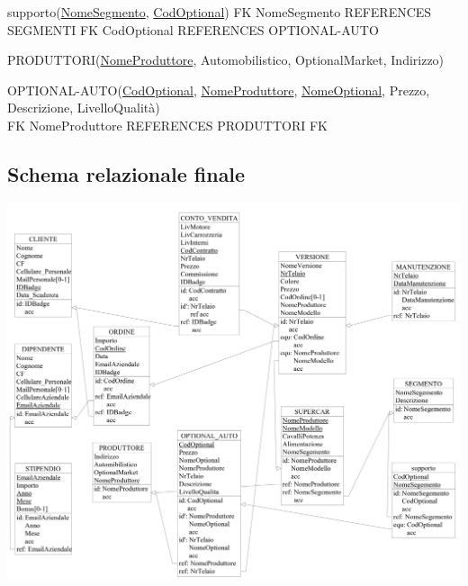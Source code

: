\documentclass[11pt]{article}
\begin{document}
\begin{flushleft}
supporto(\underline{NomeSegmento}, \underline{CodOptional})
FK NomeSegmento REFERENCES SEGMENTI
FK CodOptional REFERENCES OPTIONAL-AUTO
\end{flushleft}

\begin{flushleft}
PRODUTTORI(\underline{NomeProduttore}, Automobilistico, OptionalMarket, Indirizzo)
\end{flushleft}

\begin{flushleft}
OPTIONAL-AUTO(\underline{CodOptional}, \underline{NomeProduttore}, \underline{NomeOptional}, Prezzo, Descrizione, LivelloQualità)\\
FK NomeProduttore REFERENCES PRODUTTORI
FK 
\end{flushleft}

\normalsize

\newpage 

\subsection{Schema relazionale finale}

\begin{center}
    \includegraphics[height=\linewidth, angle=90]{images/fullSchemes/relazionale.jpeg}
\end{center}
\end{document}

